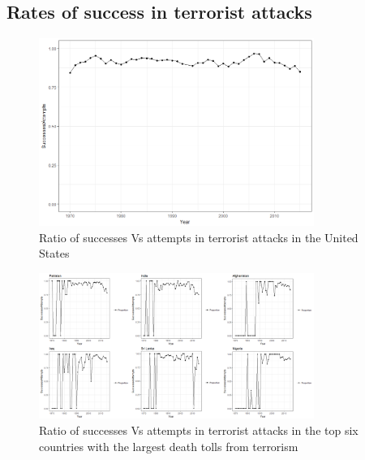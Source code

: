\documentclass[10pt,a4paper]{article}
\begin{document}
\subsection{Rates of success in terrorist attacks}
\begin{center}
	
\begin{figure}[h!]
		
	\includegraphics[width=0.8\textwidth]{Plots/OverTime/Successes_vs_Attempts_by_Year.png}
	\caption{Ratio of successes Vs attempts in terrorist attacks in the United States}

\end{figure}

\begin{figure}[h!]
		
	\includegraphics[width=0.8\textwidth]{Plots/OverTime/Top6ProportionSuccessAttempts.png}
	\caption{Ratio of successes Vs attempts in terrorist attacks in the top six countries with the largest death tolls from terrorism}

\end{figure}

\begin{figure}[h!]
		

\end{figure}
\end{center}
\end{document}
